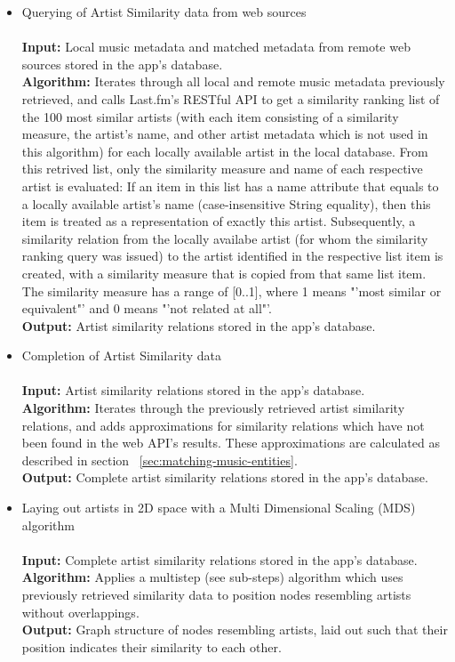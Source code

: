 \begin{itemize}
	\item Querying of Artist Similarity data from web sources \\\\
			\textbf{Input:} Local music metadata and matched metadata from remote web sources stored in the app's database. \\
			\textbf{Algorithm:} Iterates through all local and remote music metadata previously retrieved, and calls
			Last.fm's RESTful API to get a similarity ranking list of the 100 most similar artists (with each item consisting of a similarity measure, the artist's name, and other artist metadata which is not used in this algorithm) for each locally available artist in the local database. From this retrived list, only the similarity measure and name of each respective artist is evaluated: If an item in this list has a name attribute that equals to a locally available artist's name (case-insensitive String equality), then this item is treated as a representation of exactly this artist. Subsequently, a similarity relation from the locally availabe artist (for whom the similarity ranking query was issued) to the artist identified in the respective list item is created, with a similarity measure that is copied from that same list item. The similarity measure has a range of [0..1], where 1 means "'most similar or equivalent"' and 0 means "'not related at all"'.\\
			\textbf{Output:} Artist similarity relations stored in the app's database. \\
			
	\item Completion of Artist Similarity data \\\\
			\textbf{Input:} Artist similarity relations stored in the app's database. \\
			\textbf{Algorithm:} Iterates through the previously retrieved artist similarity relations, and
			adds approximations for similarity relations which have not been found in the web API's results.
			These approximations are calculated as described in section ~\ref{sec:matching-music-entities}. \\
			\textbf{Output:} Complete artist similarity relations stored in the app's database. \\
			
	\item Laying out artists in 2D space with a Multi Dimensional Scaling (MDS) algorithm \\\\
			\textbf{Input:} Complete artist similarity relations stored in the app's database.   \\
			\textbf{Algorithm:} Applies a multistep (see sub-steps) algorithm which uses previously
			retrieved similarity data to position nodes resembling artists without overlappings.  \\
			\textbf{Output:} Graph structure of nodes resembling artists, laid out such that their position 
			indicates their similarity to each other. \\
			

\end{itemize}
